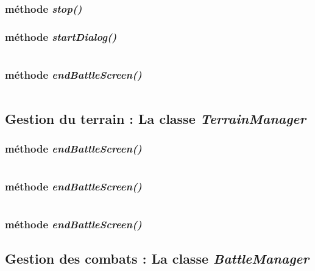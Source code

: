 \documentclass[11pt]{article}
\begin{document}
\subsubsection{méthode \textit{stop()}}

\subsubsection{méthode \textit{startDialog()}}
\begin{lstlisting}[language=JavaScript]

\end{lstlisting} 

\subsubsection{méthode \textit{endBattleScreen()}}
\begin{lstlisting}[language=JavaScript]

\end{lstlisting} 

\subsection{Gestion du terrain : La classe \textit{TerrainManager}}
\subsubsection{méthode \textit{endBattleScreen()}}
\begin{lstlisting}[language=JavaScript]

\end{lstlisting} 
\subsubsection{méthode \textit{endBattleScreen()}}
\begin{lstlisting}[language=JavaScript]

\end{lstlisting} 
\subsubsection{méthode \textit{endBattleScreen()}}
\subsection{Gestion des combats : La classe \textit{BattleManager}}
\end{document}

